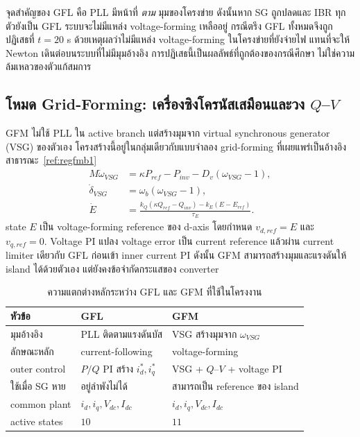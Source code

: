 \documentclass[12pt,a4paper]{article}
\newcommand{\tablefont}{\fontsize{15}{17.2}\selectfont}
\begin{document}
จุดสำคัญของ GFL คือ PLL มีหน้าที่ \emph{ตาม} มุมของโครงข่าย ดังนั้นหาก SG ถูกปลดและ IBR ทุกตัวยังเป็น GFL ระบบจะไม่มีแหล่ง voltage-forming เหลืออยู่ กรณีตรึง GFL ทั้งหมดจึงถูกปฏิเสธที่ $t=20$ s ด้วยเหตุผลว่าไม่มีแหล่ง voltage-forming ในโครงข่ายที่ยังจ่ายไฟ แทนที่จะให้ Newton เดินต่อบนระบบที่ไม่มีมุมอ้างอิง การปฏิเสธนี้เป็นผลลัพธ์ที่ถูกต้องของกรณีศึกษา ไม่ใช่ความล้มเหลวของตัวแก้สมการ

\subsection{โหมด Grid-Forming: เครื่องซิงโครนัสเสมือนและวง $Q$--$V$}
GFM ไม่ใช้ PLL ใน active branch แต่สร้างมุมจาก virtual synchronous generator (VSG) ของตัวเอง โครงสร้างนี้อยู่ในกลุ่มเดียวกับแบบจำลอง grid-forming ที่เผยแพร่เป็นอ้างอิงสาธารณะ~\ref{ref:regfmb1}
\begin{align}
M\dot\omega_{VSG}&=\kappa P_{ref}-P_{inv}-D_v(\omega_{VSG}-1),\\
\dot\delta_{VSG}&=\omega_b(\omega_{VSG}-1),\\
\dot E&=\frac{k_Q(\kappa Q_{ref}-Q_{inv})-k_E(E-E_{ref})}{\tau_E}.
\label{eq:gfmcore}
\end{align}
state $E$ เป็น voltage-forming reference ของ d-axis โดยกำหนด $v_{d,ref}=E$ และ $v_{q,ref}=0$. Voltage PI แปลง voltage error เป็น current reference แล้วผ่าน current limiter เดียวกับ GFL ก่อนเข้า inner current PI ดังนั้น GFM สามารถสร้างมุมและแรงดันให้ island ได้ด้วยตัวเอง แต่ยังคงข้อจำกัดกระแสของ converter

\begin{table}[H]
\begin{center}
\tablefont
\caption{ความแตกต่างหลักระหว่าง GFL และ GFM ที่ใช้ในโครงงาน}
\begin{tabularx}{0.96\textwidth}{@{}l L L@{}}
\toprule
หัวข้อ & GFL & GFM \\
\midrule
มุมอ้างอิง & PLL ติดตามแรงดันบัส & VSG สร้างมุมจาก $\omega_{VSG}$ \\
ลักษณะหลัก & current-following & voltage-forming \\
outer control & $P/Q$ PI สร้าง $i_d^*,i_q^*$ & VSG + $Q$--$V$ + voltage PI \\
ใช้เมื่อ SG หาย & อยู่ลำพังไม่ได้ & สามารถเป็น reference ของ island \\
common plant & $i_d,i_q,V_{dc},I_{dc}$ & $i_d,i_q,V_{dc},I_{dc}$ \\
active states & $10$ & $11$ \\
\bottomrule
\end{tabularx}
\end{center}
\end{table}
\end{document}
